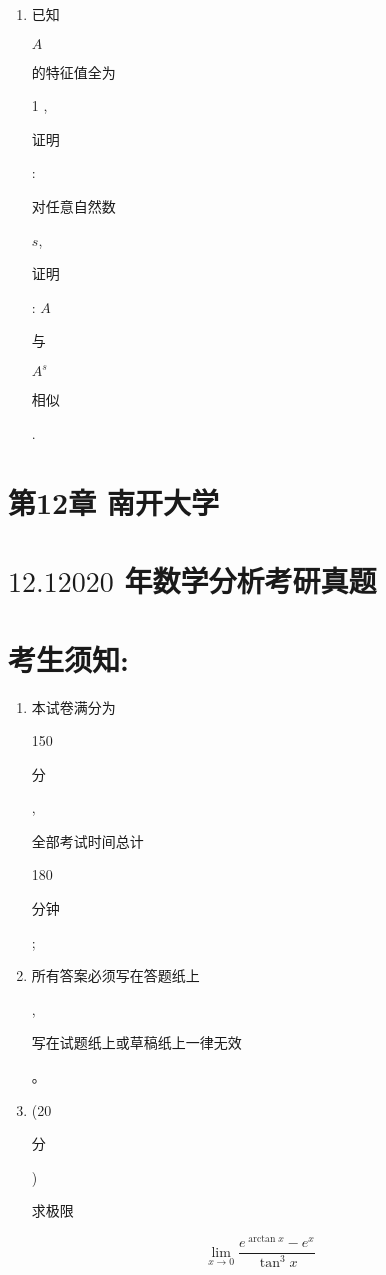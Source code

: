 \documentclass[10pt]{article}
\begin{document}
\begin{enumerate}
  \item \begin{CJK}{UTF8}{mj}已知\end{CJK} $A$ \begin{CJK}{UTF8}{mj}的特征值全为\end{CJK} 1 , \begin{CJK}{UTF8}{mj}证明\end{CJK}: \begin{CJK}{UTF8}{mj}对任意自然数\end{CJK} $s$, \begin{CJK}{UTF8}{mj}证明\end{CJK}: $A$ \begin{CJK}{UTF8}{mj}与\end{CJK} $A^{s}$ \begin{CJK}{UTF8}{mj}相似\end{CJK}.

\end{enumerate}
\section{第12章 南开大学}
\section{$12.12020$ 年数学分析考研真题}
\section{考生须知:}
\begin{enumerate}
  \item \begin{CJK}{UTF8}{mj}本试卷满分为\end{CJK} 150 \begin{CJK}{UTF8}{mj}分\end{CJK}, \begin{CJK}{UTF8}{mj}全部考试时间总计\end{CJK} 180 \begin{CJK}{UTF8}{mj}分钟\end{CJK};

  \item \begin{CJK}{UTF8}{mj}所有答案必须写在答题纸上\end{CJK}, \begin{CJK}{UTF8}{mj}写在试题纸上或草稿纸上一律无效\end{CJK}。

  \item (20 \begin{CJK}{UTF8}{mj}分\end{CJK}) \begin{CJK}{UTF8}{mj}求极限\end{CJK}

\end{enumerate}
$$
\lim _{x \rightarrow 0} \frac{e^{\arctan x}-e^{x}}{\tan ^{3} x}
$$
\end{document}

